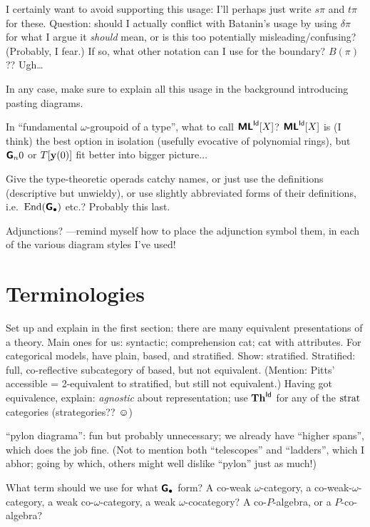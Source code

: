 \documentclass{amsart}
\begin{document}
I certainly want to avoid supporting this usage: I'll perhaps just write $s\pi$ and $t\pi$ for these.  Question: should I actually conflict with Batanin's usage by using $\delta \pi$ for what I argue it \emph{should} mean, or is this too potentially misleading/confusing?  (Probably, I fear.)  If so, what other notation can I use for the boundary?  $B(\pi)$??  Ugh\ldots

In any case, make sure to explain all this usage in the background introducing pasting diagrams.

\para In ``fundamental $\omega$-groupoid of a type'', what to call $\textsf{\textbf{ML}}^{\mathsf{Id}}[X]$?  $\textsf{\textbf{ML}}^{\mathsf{Id}}[X]$ is (I think) the best option in isolation (usefully evocative of polynomial rings), but $\textsf{\textbf{G}}_{n}{0}$ or $\\T[\mathbf{y}(0)]$ fit better into bigger picture$\ldots$

\para Give the type-theoretic operads catchy names, or just use the definitions (descriptive but unwieldy), or use slightly abbreviated forms of their definitions, i.e.\ $\mathrm{End}(\textsf{\textbf{G}}_\bullet)$ etc.?  Probably this last.

\para Adjunctions? ---remind myself how to place the adjunction symbol them, in each of the various diagram styles I've used!

\section{Terminologies}

\para Set up and explain in the first section: there are many equivalent presentations of a theory.  Main ones for us: syntactic; comprehension cat; cat with attributes.  For categorical models, have plain, based, and stratified.  Show: stratified.  Stratified: full, co-reflective subcategory of based, but not equivalent.  (Mention: Pitts' accessible = 2-equivalent to stratified, but still not equivalent.)  Having got equivalence, explain: \emph{agnostic} about representation; use $\mathbf{Th}^{\mathsf{Id}}$ for any of the $\textrm{strat}$ categories (strategories?? $\smiley$)

\para ``pylon diagrama'': fun but probably unnecessary; we already have ``higher spans'', which does the job fine. (Not to mention both ``telescopes'' and ``ladders'', which I abhor; going by which, others might well dislike ``pylon'' just as much!)

\para What term should we use for what $\textsf{\textbf{G}}_\bullet$ form?  A co-weak $\omega$-category, a co-weak-$\omega$-category, a weak co-$\omega$-category, a weak $\omega$-cocategory?  A co-$P$-algebra, or a $P$-co-algebra?
\end{document}
